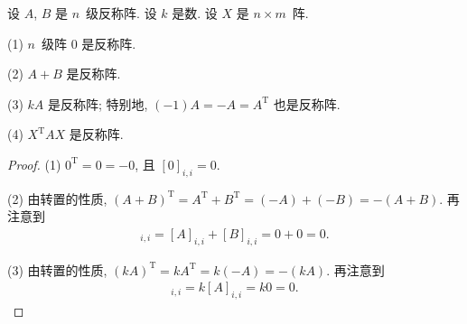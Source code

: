\begin{theorem}
    设 \(A\), \(B\) 是 \(n\)~级反称阵.
    设 \(k\) 是数.
    设 \(X\) 是 \(n \times m\)~阵.

    (1)
    \(n\)~级阵 \(0\) 是反称阵.

    (2)
    \(A + B\) 是反称阵.

    (3)
    \(kA\) 是反称阵;
    特别地, \((-1)A = -A = A^{\mathrm{T}}\) 也是反称阵.

    (4)
    \(X^{\mathrm{T}} A X\) 是反称阵.
\end{theorem}

\begin{proof}
    (1)
    \(0^{\mathrm{T}} = 0 = -0\),
    且 \([0]_{i,i} = 0\).

    (2)
    由转置的性质,
    \((A + B)^{\mathrm{T}} = A^{\mathrm{T}} + B^{\mathrm{T}}
    = (-A) + (-B) = -(A + B)\).
    再注意到
    \begin{align*}
        [A + B]_{i,i} = [A]_{i,i} + [B]_{i,i} = 0 + 0 = 0.
    \end{align*}

    (3)
    由转置的性质,
    \((kA)^{\mathrm{T}} = kA^{\mathrm{T}} = k(-A) = -(kA)\).
    再注意到
    \begin{align*}
        [kA]_{i,i} = k [A]_{i,i} = k 0 = 0.
    \end{align*}


\end{proof}
